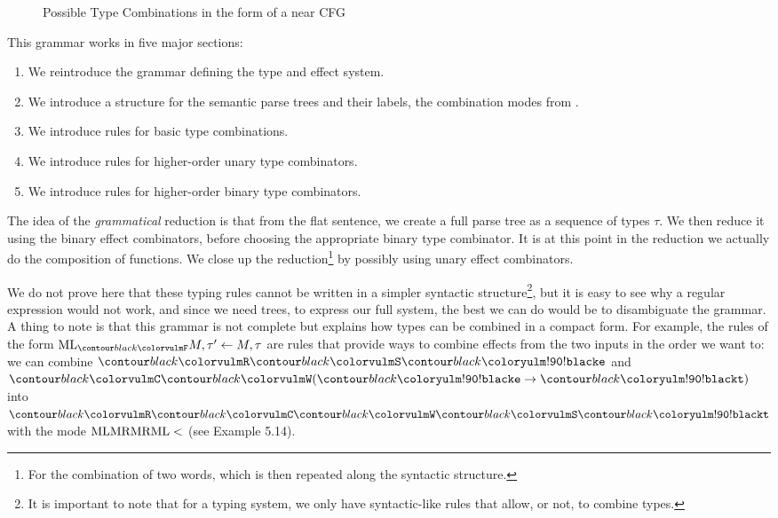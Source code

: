 \begin{figure}
	\centering
	
	\caption{Possible Type Combinations in the form of a near CFG}
	\label{fig:combination-cfg}
\end{figure}

This grammar works in five major sections:
\begin{enumerate}
	\item We reintroduce the grammar defining the type and effect system.
	\item We introduce a structure for the semantic parse trees and their labels,
	      the combination modes from
	      .
	\item We introduce rules for basic type combinations.
	\item We introduce rules for higher-order unary type combinators.
	\item We introduce rules for higher-order binary type combinators.
\end{enumerate}
The idea of the \emph{grammatical} reduction is that from the flat sentence,
we create a full parse tree as a sequence of types $\tau$.
We then reduce it using the binary effect combinators, before choosing the
appropriate binary type combinator.
It is at this point in the reduction we actually do the composition
of functions.
We close up the reduction\footnote{For the combination of two words, which is
	then repeated along the syntactic structure.} by possibly using unary effect
combinators.

\medskip

We do not prove here that these typing rules cannot be written in a simpler
syntactic structure\footnote{It is important to note that for a typing system,
	we only have syntactic-like rules that allow, or not, to combine types.}, but
it is easy to see why a regular expression would not work, and since we need
trees, to express our full system, the best we can do would be to disambiguate
the grammar.
A thing to note is that this grammar is not complete but explains how types can
be combined in a compact form.
For example, the rules of the form $\combML_{\f{F}} M, \tau' \gets M, \tau$ are
rules that provide ways to combine effects from the two inputs in the order we
want to: we can combine $\f{R}\f{S}\e$ and $\f{C}\f{W}(\e \to \t)$ into
$\f{R}\f{C}\f{W}\f{S}\t$ with the mode $\text{ML}\text{MR}\text{MR}\text{ML} <$ (see
\cite{bumfordEffectdrivenInterpretationFunctors2025} Example 5.14).

